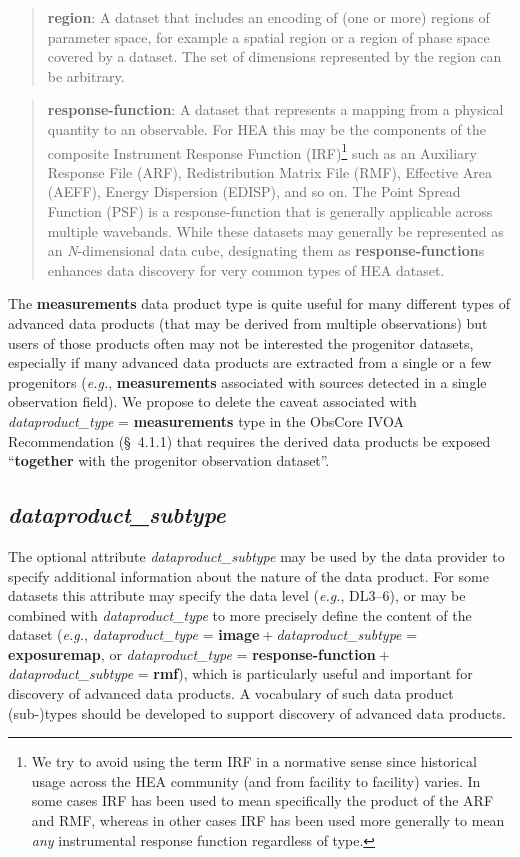 \documentclass[11pt,a4paper]{ivoa}
\begin{document}
\begin{quote}
{\bf region}: A dataset that includes an encoding of (one or more) regions of parameter space, for example a spatial region or a region of phase space covered by a dataset.  The set of dimensions represented by the region can be arbitrary.
\end{quote}

\begin{quote}
{\bf response-function}: A dataset that represents a mapping from a physical quantity to an observable.  For HEA this may be the components of the composite Instrument Response Function (IRF)\footnote{We try to avoid using the term IRF in a normative sense since historical usage across the HEA community (and from facility to facility) varies.  In some cases IRF has been used to mean specifically the product of the ARF and RMF, whereas in other cases IRF has been used more generally to mean {\em any\/} instrumental response function regardless of type.} such as an Auxiliary Response File (ARF), Redistribution Matrix File (RMF), Effective Area (AEFF), Energy Dispersion (EDISP), and so on.  The Point Spread Function (PSF) is a response-function that is generally applicable across multiple wavebands.  While these datasets may generally be represented as an {\em N\/}-dimensional data cube, designating them as {\bf response-function}s enhances data discovery for very common types of HEA dataset.
\end{quote}

The {\bf measurements} data product type is quite useful for many different types of advanced data products (that may be derived from multiple observations) but users of those products often may not be interested the progenitor datasets, especially if many advanced data products are extracted from a single or a few progenitors ({\em e.g.\/}, {\bf measurements} associated with sources detected in a single observation field).  We propose to delete the caveat associated with {\em dataproduct\_type\/} = {\bf measurements} type in the ObsCore IVOA Recommendation (\S~4.1.1) that requires the derived data products be exposed ``{\bf together} with the progenitor observation dataset''.  

\subsection{{\em dataproduct\_subtype}}

The optional attribute {\em dataproduct\_subtype} may be used by the data provider to specify additional information about the nature of the data product.  For some datasets this attribute may specify the data level ({\em e.g.\/}, DL3--6), or may be combined with {\em dataproduct\_type\/} to more precisely define the content of the dataset ({\em e.g.\/}, {\em dataproduct\_type\/} = {\bf image}${}+{}${\em dataproduct\_subtype\/} = {\bf exposuremap}, or {\em dataproduct\_type\/} = {\bf response-function}${}+{}${\em dataproduct\_subtype\/} = {\bf rmf}), which is particularly useful and important for discovery of advanced data products.  A vocabulary of such data product (sub-)types should be developed to support discovery of advanced data products.
\end{document}
